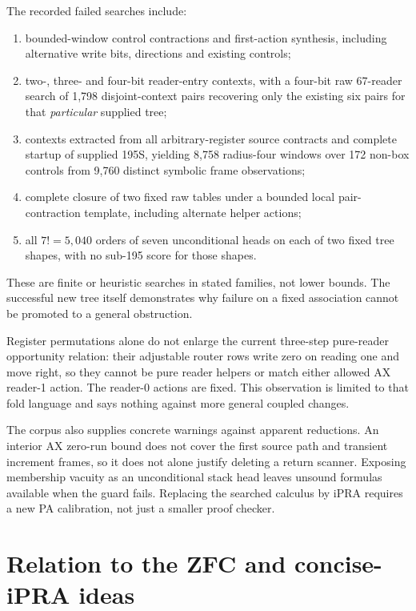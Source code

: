 \documentclass[11pt,letterpaper]{article}
\begin{document}
The recorded failed searches include:
\begin{enumerate}
\item bounded-window control contractions and first-action synthesis,
      including alternative write bits, directions and existing controls;
\item two-, three- and four-bit reader-entry contexts, with a four-bit raw
      67-reader search of 1,798 disjoint-context pairs recovering only the
      existing six pairs for that \emph{particular} supplied tree;
\item contexts extracted from all arbitrary-register source contracts and
      complete startup of supplied 195S, yielding 8,758 radius-four windows
      over 172 non-box controls from 9,760 distinct symbolic frame observations;
\item complete closure of two fixed raw tables under a bounded local
      pair-contraction template, including alternate helper actions;
\item all $7!=5,040$ orders of seven unconditional heads on each of two
      fixed tree shapes, with no sub-195 score for those shapes.
\end{enumerate}
These are finite or heuristic searches in stated families, not lower
bounds. The successful new tree itself demonstrates why failure on a
fixed association cannot be promoted to a general obstruction.

Register permutations alone do not enlarge the current three-step
pure-reader opportunity relation: their adjustable router rows write zero
on reading one and move right, so they cannot be pure reader helpers or
match either allowed AX reader-1 action. The reader-0 actions are fixed.
This observation is limited to that fold language and says nothing
against more general coupled changes.

The corpus also supplies concrete warnings against apparent reductions.
An interior AX zero-run bound does not cover the first source path and
transient increment frames, so it does not alone justify deleting a
return scanner. Exposing membership vacuity as an unconditional stack head
leaves unsound formulas available when the guard fails. Replacing the
searched calculus by iPRA requires a new PA calibration, not just a smaller
proof checker.

\section{Relation to the ZFC and concise-iPRA ideas}
\end{document}
